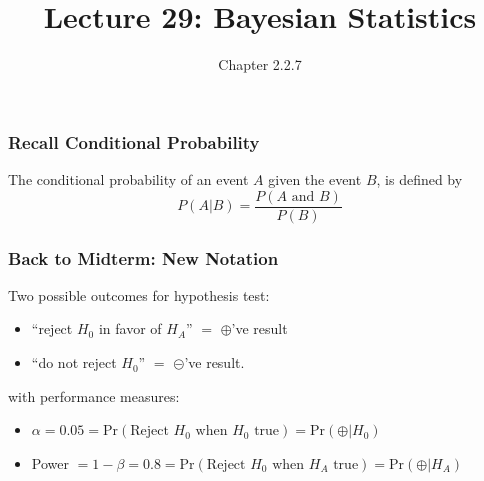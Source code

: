 \documentclass[handout]{beamer}
\title{Lecture 29: Bayesian Statistics}
\author{Chapter 2.2.7}
\date{}
\newcommand{\blue}[1]{\textcolor{blue2}{#1}}
\newcommand{\prob}{\mbox{Pr}}
\newcommand{\cp}{\oplus}
\newcommand{\cm}{\circleddash}
\begin{document}
\begin{frame}
\titlepage
\end{frame}



\begin{frame}
\frametitle{Recall Conditional Probability}

%
%
The \blue{conditional probability} of an event $A$ given the event $B$, is defined by
\[
P(A|B) = \frac{P(A \mbox{ and } B)}{P(B)}
\]  

\end{frame}



\begin{frame}
\frametitle{Back to Midterm: New Notation}

%
%
Two possible outcomes for hypothesis test:
\begin{itemize}
\item ``reject $H_0$ in favor of $H_A$'' $=$ $\cp$'ve result
\item ``do not reject $H_0$'' $=$ $\cm$'ve result.
\end{itemize}
\pause
\vspace{0.5cm}

with performance measures:
\begin{itemize}
\item $\alpha=0.05=\prob(\mbox{Reject } H_0 \mbox{ when $H_0$ true}) = \prob(\cp|H_0)$
\item Power $=1-\beta=0.8=\prob(\mbox{Reject } H_0 \mbox{ when $H_A$ true}) = \prob(\cp|H_A)$
\end{itemize} 

\end{frame}
\end{document}
